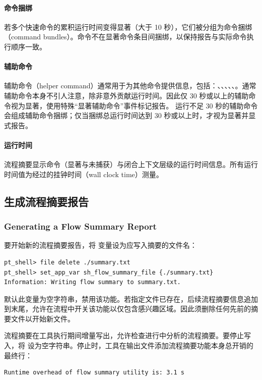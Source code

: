 \paragraph{命令捆绑}
若多个快速命令的累积运行时间变得显著（大于 10 秒），它们被分组为命令捆绑（command bundles）。命令不在显著命令条目间捆绑，以保持报告与实际命令执行顺序一致。

\paragraph{辅助命令}
辅助命令（helper command）通常用于为其他命令提供信息，包括：、、、、、。通常辅助命令本身不引人注意，除非意外贡献运行时间。因此仅 30 秒或以上的辅助命令视为显著，使用特殊``显著辅助命令''事件标记报告。
运行不足 30 秒的辅助命令会组成辅助命令捆绑；仅当捆绑总运行时间达到
30 秒或以上时，才视为显著并显式报告。

\paragraph{运行时间}
流程摘要显示命令（显著与未捕获）与闭合上下文层级的运行时间信息。所有运行时间值为经过的挂钟时间（wall clock time）测量。

\subsection{生成流程摘要报告}
\subsubsection*{Generating a Flow Summary Report}

要开始新的流程摘要报告，将  变量设为应写入摘要的文件名：
\begin{lstlisting}
pt_shell> file delete ./summary.txt
pt_shell> set_app_var sh_flow_summary_file {./summary.txt}
Information: Writing flow summary to summary.txt.
\end{lstlisting}

默认此变量为空字符串，禁用该功能。若指定文件已存在，后续流程摘要信息追加到末尾，允许在流程中开关该功能以仅包含感兴趣区域。因此须删除任何先前的摘要文件以开始新文件。

流程摘要在工具执行期间增量写出，允许检查进行中分析的流程摘要。要停止写入，将  设为空字符串。停止时，工具在输出文件添加流程摘要功能本身总开销的最终行：
\begin{lstlisting}
Runtime overhead of flow summary utility is: 3.1 s
\end{lstlisting}

